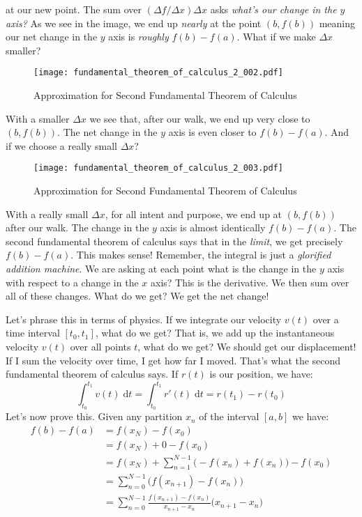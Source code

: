\documentclass{article}
\begin{document}
    at our new point. The sum over $(\Delta{f}/\Delta{x})\Delta{x}$ asks
    \textit{what's our change in the $y$ axis?} As we see in the image, we end up
    \textit{nearly} at the point $(b, f(b))$ meaning our net change in the $y$
    axis is \textit{roughly} $f(b)-f(a)$. What if we make $\Delta{x}$ smaller?
    \begin{figure}
        \centering
        \texttt{[image: fundamental\_theorem\_of\_calculus\_2\_002.pdf]}
        \caption{Approximation for Second Fundamental Theorem of Calculus}
    \end{figure}
    With a smaller $\Delta{x}$ we see that, after our walk, we end up very close
    to $(b,f(b))$. The net change in the $y$ axis is even closer to
    $f(b)-f(a)$. And if we choose a really small $\Delta{x}$?
    \begin{figure}
        \centering
        \texttt{[image: fundamental\_theorem\_of\_calculus\_2\_003.pdf]}
        \caption{Approximation for Second Fundamental Theorem of Calculus}
    \end{figure}
    With a really small $\Delta{x}$, for all intent and purpose, we end up
    at $(b,f(b))$ after our walk. The change in the $y$ axis is almost
    identically $f(b)-f(a)$. The second fundamental theorem of calculus says
    that in the \textit{limit}, we get precisely $f(b)-f(a)$. This makes sense!
    Remember, the integral is just a \textit{glorified addition machine}. We
    are asking at each point what is the change in the $y$ axis with respect to
    a change in the $x$ axis? This is the derivative. We then sum over all of
    these changes. What do we get? We get the net change!
    \par\hfill\par
    Let's phrase this in terms of physics. If we integrate our velocity $v(t)$
    over a time interval $[t_{0},t_{1}]$, what do we get? That is, we add up
    the instantaneous velocity $v(t)$ over all points $t$, what do we get?
    We should get our displacement! If I sum the velocity over time, I get how
    far I moved. That's what the second fundamental theorem of calculus says.
    If $r(t)$ is our position, we have:
    \begin{equation}
        \int_{t_{0}}^{t_{1}}v(t)\;\textrm{d}t
            =\int_{t_{0}}^{t_{1}}r'(t)\;\textrm{d}t
            =r(t_{1})-r(t_{0})
    \end{equation}
    Let's now prove this. Given any partition $x_{n}$ of the interval $[a,b]$
    we have:
    \begin{align}
        f(b)-f(a)&=f(x_{N})-f(x_{0})\\
            &=f(x_{N})+0-f(x_{0})\\
            &=f(x_{N})+\sum_{n=1}^{N-1}\Big(-f(x_{n})+f(x_{n})\Big)-f(x_{0})\\
            &=\sum_{n=0}^{N-1}\Big(f(x_{n+1})-f(x_{n})\Big)\\
            &=\sum_{n=0}^{N-1}\frac{f(x_{n+1})-f(x_{n})}{x_{n+1}-x_{n}}
                \big(x_{n+1}-x_{n}\big)
    \end{align}
\end{document}
